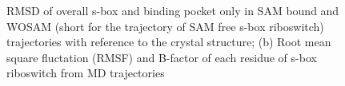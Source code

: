 \documentclass[a4paper,10pt]{article}
\begin{document}
\begin{figure}
    \newline
\caption{RMSD of overall s-box and binding pocket only in SAM bound and WOSAM (short for the 
trajectory of SAM free s-box riboswitch) trajectories  with reference to the crystal structure; (b) Root mean square fluctation (RMSF) and B-factor of each residue of s-box riboswitch from MD trajectories}
\end{figure}
\end{document}
